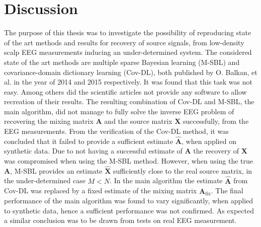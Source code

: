 \chapter{Discussion}
The purpose of this thesis was to investigate the possibility of reproducing state of the art methods and results for recovery of source signals, from low-density scalp EEG measurements inducing an under-determined system.
The considered state of the art methods are multiple sparse Bayesian learning (M-SBL)\cite{Balkan2014} and covariance-domain dictionary learning (Cov-DL)\cite{Balkan2015}, both published by O. Balkan, et al. in the year of 2014 and 2015 respectively. 
It was found that this task was not easy. Among others did the scientific articles not provide any software to allow recreation of their results. The resulting combination of Cov-DL and M-SBL, the main algorithm, did not manage to fully solve the inverse EEG problem of recovering the mixing matrix $\mathbf{A}$ and the source matrix $\mathbf{X}$ successfully, from the EEG measurements. 
From the verification of the Cov-DL method, it was concluded that it failed to provide a sufficient estimate $\hat{\mathbf{A}}$, when applied on synthetic data. 
Due to not having a successful estimate of $\mathbf{A}$ the recovery of  $\mathbf{X}$ was compromised when using the M-SBL method.
However, when using the true $\mathbf{A}$, M-SBL provides an estimate $\hat{\mathbf{X}}$ sufficiently close to the real source matrix, in the under-determined case $M < N$. 
In the main algorithm the estimate $\hat{\mathbf{A}}$ from Cov-DL was replaced by a fixed estimate of the mixing matrix $\hat{\mathbf{A}}_{\text{fix}}$. 
The final performance of the main algorithm was found to vary significantly, when applied to synthetic data, hence a sufficient performance was not confirmed. 
As expected a similar conclusion was to be drawn from tests on real EEG measurement. 

